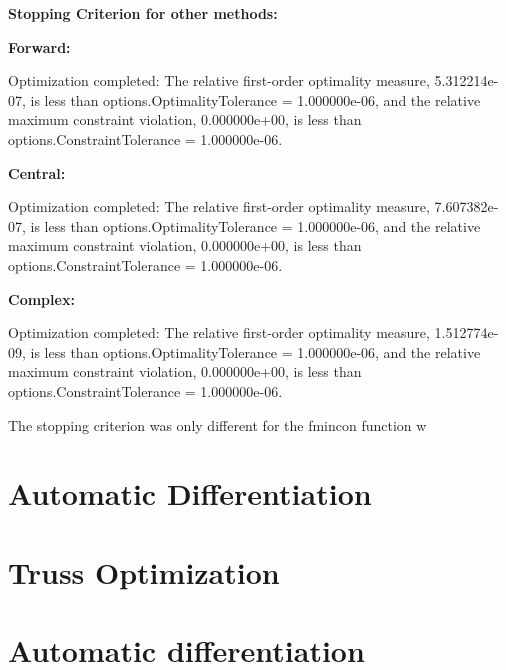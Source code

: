 \documentclass[a4paper]{article}
\begin{document}
\textbf{Stopping Criterion for other methods:}

\textbf{Forward:}

Optimization completed: The relative first-order optimality measure, 5.312214e-07, is less than options.OptimalityTolerance = 1.000000e-06, and the relative maximum constraint violation, 0.000000e+00, is less than options.ConstraintTolerance = 1.000000e-06.

\textbf{Central:}

Optimization completed: The relative first-order optimality measure, 7.607382e-07, is less than options.OptimalityTolerance = 1.000000e-06, and the relative maximum constraint violation, 0.000000e+00, is less than options.ConstraintTolerance = 1.000000e-06.

\textbf{Complex:}

Optimization completed: The relative first-order optimality measure, 1.512774e-09, is less than options.OptimalityTolerance = 1.000000e-06, and the relative maximum constraint violation, 0.000000e+00, is less than options.ConstraintTolerance = 1.000000e-06.

The stopping criterion was only different for the fmincon function w
\section{Automatic Differentiation}

\appendix
\section{Truss Optimization}
\label{appendix.trussCode}
 
\section{Automatic differentiation}
 
\end{document}
